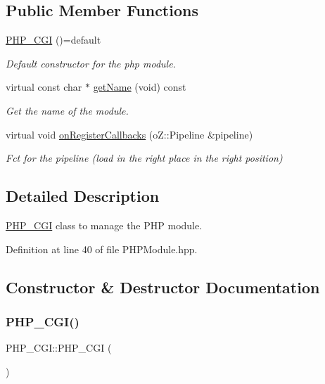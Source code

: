 \subsection*{Public Member Functions}
\begin{DoxyCompactItemize}
\item 
\hyperlink{class_p_h_p___c_g_i_a4ce89837013dbd5836475cbded08dee7}{P\+H\+P\+\_\+\+C\+GI} ()=default
\begin{DoxyCompactList}\small\item\em Default constructor for the php module. \end{DoxyCompactList}\item 
virtual const char $\ast$ \hyperlink{class_p_h_p___c_g_i_a6446691803801b4100f18bcd53899237}{get\+Name} (void) const
\begin{DoxyCompactList}\small\item\em Get the name of the module. \end{DoxyCompactList}\item 
virtual void \hyperlink{class_p_h_p___c_g_i_a5f85735822d4cb288b34182d43b2d059}{on\+Register\+Callbacks} (o\+Z\+::\+Pipeline \&pipeline)
\begin{DoxyCompactList}\small\item\em Fct for the pipeline (load in the right place in the right position) \end{DoxyCompactList}\end{DoxyCompactItemize}


\subsection{Detailed Description}
\hyperlink{class_p_h_p___c_g_i}{P\+H\+P\+\_\+\+C\+GI} class to manage the P\+HP module. 

Definition at line 40 of file P\+H\+P\+Module.\+hpp.



\subsection{Constructor \& Destructor Documentation}
\mbox{\label{class_p_h_p___c_g_i_a4ce89837013dbd5836475cbded08dee7}} 
\subsubsection{\texorpdfstring{P\+H\+P\+\_\+\+C\+G\+I()}{PHP\_CGI()}}
{\footnotesize\ttfamily P\+H\+P\+\_\+\+C\+G\+I\+::\+P\+H\+P\+\_\+\+C\+GI (\begin{DoxyParamCaption}{ }\end{DoxyParamCaption})\hspace{0.3cm}{\ttfamily [default]}}




